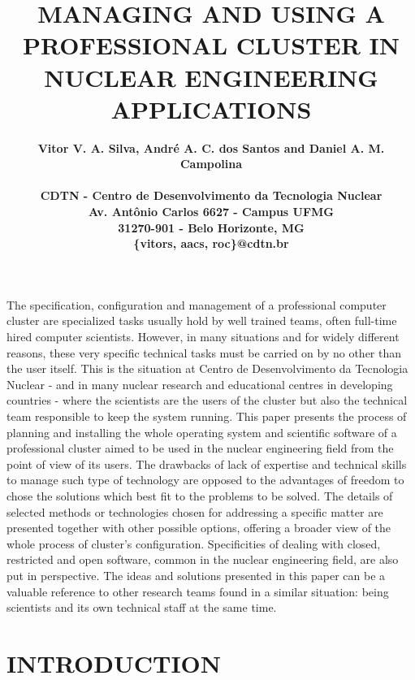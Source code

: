 \documentclass[twoside,a4paper,12pt,english]{inac17}
\title{MANAGING AND USING A PROFESSIONAL CLUSTER IN NUCLEAR ENGINEERING APPLICATIONS}
\author{
  \bf{Vitor V. A. Silva, Andr\'e A. C. dos Santos and Daniel A. M. Campolina}\\ \\
  CDTN - Centro de Desenvolvimento da Tecnologia Nuclear\\
  Av. Ant\^onio Carlos 6627 - Campus UFMG\\
  31270-901 - Belo Horizonte, MG\\
  \{vitors, aacs, roc\}@cdtn.br}
\begin{document}
\maketitle

\tableofcontents
\tableofcontents


\pagestyle{myheadings}
\thispagestyle{empty}
\markboth{}{}


\thispagestyle{empty}

\begin{abstract_full_paper}
  The specification, configuration and management of a professional computer cluster are specialized
tasks usually hold by well trained teams, often full-time hired computer scientists. However, in
many situations and for widely different reasons, these very specific technical tasks must
be carried on by no other than the user itself. This is the situation at Centro de Desenvolvimento
da Tecnologia Nuclear - and in many nuclear research and educational centres in developing countries -
where the scientists are the users of the cluster but also the technical
team responsible to keep the system running. This paper presents the process of planning
and installing the whole operating system and scientific software of a professional cluster
aimed to be used in the nuclear engineering field from the point of view of its users.
The drawbacks of lack of expertise and technical skills to
manage such type of technology are opposed to the advantages of freedom to chose the solutions
which best fit to the problems to be solved. The details of selected methods or technologies
chosen for addressing a specific matter are presented together with other possible options, 
offering a broader view of the whole process of cluster's configuration. Specificities
of dealing with closed, restricted and open software, common in the nuclear engineering field,
are also put in perspective. The ideas and solutions presented in this paper can be a
valuable reference to other research teams found in a similar situation:
being scientists and its own technical staff at the same time.
\end{abstract_full_paper}

\section{INTRODUCTION}\label{int}
\end{document}

